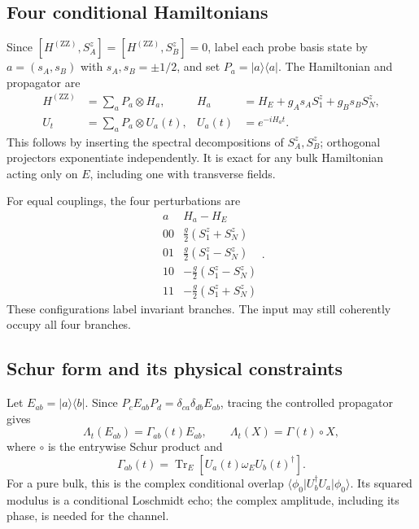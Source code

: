 \documentclass[11pt,a4paper]{article}
\newcommand{\ket}[1]{\lvert #1\rangle}
\newcommand{\bra}[1]{\langle #1\rvert}
\newcommand{\Tr}{\operatorname{Tr}}
\newcommand{\ZZ}{\mathrm{ZZ}}
\begin{document}
\subsection{Four conditional Hamiltonians}

Since $[H^{(\ZZ)},S_A^z]=[H^{(\ZZ)},S_B^z]=0$, label each probe basis
state by $a=(s_A,s_B)$ with $s_A,s_B=\pm1/2$, and set
$P_a=\ket a\bra a$. The Hamiltonian and propagator are
\begin{align}
 H^{(\ZZ)}&=\sum_a P_a\otimes H_a,
 &H_a&=H_E+g_A s_A S_1^z+g_B s_B S_N^z,\label{eq:conditional}\\
 U_t&=\sum_aP_a\otimes U_a(t),
 &U_a(t)&=e^{-iH_at}.
\end{align}
This follows by inserting the spectral decompositions of $S_A^z,S_B^z$;
orthogonal projectors exponentiate independently. It is exact for any
bulk Hamiltonian acting only on $E$, including one with transverse fields.

For equal couplings, the four perturbations are
\begin{equation}
\begin{array}{c|c}
 a&H_a-H_E\\\hline
 00&\frac g2(S_1^z+S_N^z)\\
 01&\frac g2(S_1^z-S_N^z)\\
 10&-\frac g2(S_1^z-S_N^z)\\
 11&-\frac g2(S_1^z+S_N^z)
\end{array}.
\end{equation}
These configurations label invariant branches. The input may still
coherently occupy all four branches.

\subsection{Schur form and its physical constraints}

Let $E_{ab}=\ket a\bra b$. Since
$P_cE_{ab}P_d=\delta_{ca}\delta_{db}E_{ab}$, tracing the controlled
propagator gives
\begin{equation}
 \boxed{\Lambda_t(E_{ab})=\Gamma_{ab}(t)E_{ab},\qquad
 \Lambda_t(X)=\Gamma(t)\circ X,}
 \label{eq:schur}
\end{equation}
where $\circ$ is the entrywise Schur product and
\begin{equation}
 \Gamma_{ab}(t)=\Tr_E[U_a(t)\omega_E U_b(t)^\dagger].
 \label{eq:gamma}
\end{equation}
For a pure bulk, this is the complex conditional overlap
$\bra{\phi_0}U_b^\dagger U_a\ket{\phi_0}$. Its squared modulus is a
conditional Loschmidt echo; the complex amplitude, including its phase,
is needed for the channel.
\end{document}
